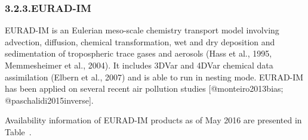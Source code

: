 \documentclass[9pt]{report}
\begin{document}
\subsubsection{3.2.3.\hspace*{0.5em}EURAD-IM}\label{sec-eurad-im}%

\noindent{}EURAD-IM is an Eulerian meso-scale chemistry transport model involving advection, diffusion, chemical transformation, wet and dry deposition and sedimentation of tropospheric trace gases and aerosols (Hass et al., 1995, Memmesheimer et al., 2004). It includes 3DVar and 4DVar chemical data assimilation (Elbern et al., 2007) and is able to run in nesting mode.
EURAD-IM has been applied on several recent air pollution studies [@monteiro2013bias; @paschalidi2015inverse].%

Availability information of EURAD-IM products as of May 2016 are presented in Table~.%
\end{document}
